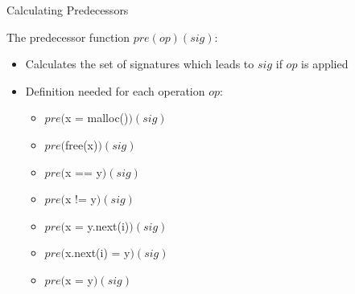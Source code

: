 \begin{frame}[fragile]{Calculating Predecessors}
    
    \pause

    The predecessor function $pre(op)(sig)$:

    \pause

    \begin{itemize}
        \item <3-> Calculates the set of signatures which leads to $sig$ if $op$ is applied
        \item <4-> Definition needed for each operation $op$:
            \begin{itemize}
                \item <5-> $pre($x = malloc()$)(sig)$
                \item <6-> $pre($free(x)$)(sig)$
                \item <7-> $pre($x == y$)(sig)$
                \item <8-> $pre($x != y$)(sig)$
                \item <9-> $pre($x = y.next(i)$)(sig)$
                \item <10-> $pre($x.next(i) = y$)(sig)$
                \item <11-> $pre($x = y$)(sig)$
            \end{itemize}
    \end{itemize}

\end{frame}